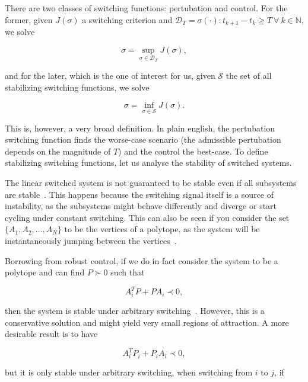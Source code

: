 There are two classes of switching functions: pertubation and control. For the
former, given \(J(\sigma)\) a switching criterion and
\(\mathcal{D}_{T}=\sigma(\cdot):t_{k+1}-t_{k}\ge{}T~\forall{}~k\in{}\mathbb{N}\), we solve

\begin{equation}
	\sigma = \sup_{\sigma\in\mathcal{D}_{T}} J(\sigma),
\end{equation}

and for the later, which is the one of interest for us, given \(\mathcal{S}\)
the set of all stabilizing switching functions, we solve

\begin{equation}
	\sigma = \inf_{\sigma\in\mathcal{S}} J(\sigma).
\end{equation}

This is, however, a very broad definition. In plain english, the pertubation
switching function finds the worse-case scenario (the admissible pertubation
depends on the magnitude of \(T\)) and the control the best-case. To define
stabilizing switching functions, let us analyse the stability of switched
systems.

The linear switched system is not guaranteed to be stable even if all subsystems
are stable~\parencite{liberzon.morse:basic}. This happens because the switching
signal itself is a source of instability, as the subsystems might behave
differently and diverge or start cycling under constant switching. This can also
be seen if you consider the set \(\{A_{1}, A_{2}, \ldots, A_{N}\}\) to be the
vertices of a polytope, as the system will be instantaneously jumping between
the vertices~\parencite{geromel.colaneri:stabilization}.

Borrowing from robust control, if we do in fact consider the system to be a
polytope and can find \(P\succ{}0\) such that

\begin{equation}
	A_{i}^{T}P+PA_{i} \prec{} 0,
\end{equation}

then the system is stable under arbitrary
switching~\parencite{geromel.deaecto:stability}. However, this is a conservative
solution and might yield very small regions of attraction. A more desirable
result is to have

\begin{equation}
	A_{i}^{T}P_{i}+P_{i}A_{i} \prec{} 0,
\end{equation}

but it is only stable under arbitrary switching, when switching from
\(i\) to \(j\), if

